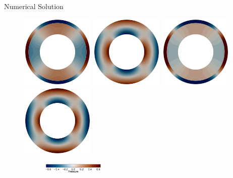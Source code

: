\documentclass[10pt,aspectratio=169]{beamer}
\begin{document}
\begin{frame}{Numerical Solution}
	\begin{figure}[!htb]
		\vspace{-0.5in}
		\begin{multicols}{4}
			\includegraphics[width=3.5cm]{./case1/p_uw.png}\par
			\hspace{0.75in}
			\includegraphics[width=3.5cm]{./case2/p_uw.png}\par
			\hspace{1.5in}
			\includegraphics[width=3.5cm]{./case3/p_uw.png}\par
			\hspace{2.25in}
			\includegraphics[width=3.5cm]{./case4/p_uw.png}
		\end{multicols}
		\vspace{-0.27in}
		\begin{figure}
			\hspace{0.1in} 
			\includegraphics[width=3cm]{./case1/p_ana_cbhorz.pdf}
		\end{figure}
	\end{figure}
\end{frame}
\end{document}
